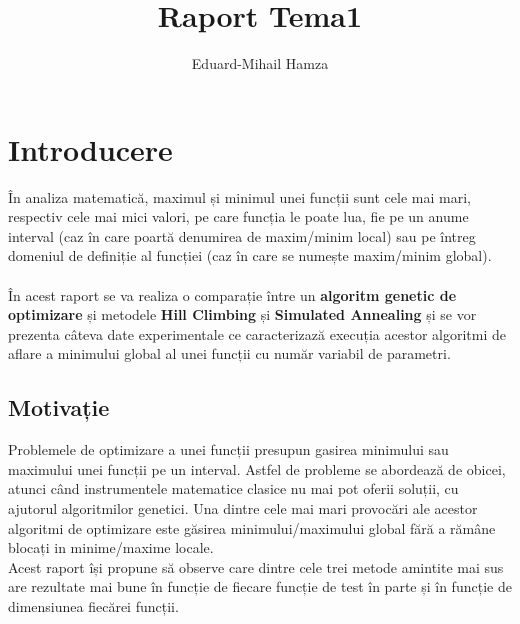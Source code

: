 \documentclass{article}
\author{Eduard-Mihail Hamza}
\title{Raport Tema1}
\begin{document}
\maketitle

\section{Introducere}

În analiza matematică, maximul și minimul unei funcții sunt cele mai mari, respectiv cele mai mici valori, pe care funcția le poate lua, fie pe un anume interval (caz în care poartă denumirea de maxim/minim local) sau pe întreg domeniul de definiție al funcției (caz în care se numește maxim/minim global).\\ \\
În acest raport se va realiza o comparație între un \textbf{algoritm genetic de optimizare} și metodele \textbf{Hill Climbing} și \textbf{Simulated Annealing} și se vor prezenta câteva date experimentale ce caracterizază execuția acestor algoritmi de aflare a minimului global al unei funcții cu număr variabil de parametri.

 
\subsection{Motivație}
Problemele de optimizare a unei funcții presupun gasirea minimului sau maximului unei funcții pe un interval. Astfel de probleme se abordează de obicei, atunci când instrumentele matematice clasice nu mai pot oferii soluții, cu ajutorul algoritmilor genetici. Una dintre cele mai mari provocări ale acestor algoritmi de optimizare este găsirea minimului/maximului global fără a rămâne blocați in minime/maxime locale.\\
Acest raport își propune să observe care dintre cele trei metode amintite mai sus are rezultate mai bune în funcție de fiecare funcție de test în parte și în funcție de dimensiunea fiecărei funcții.
\end{document}
